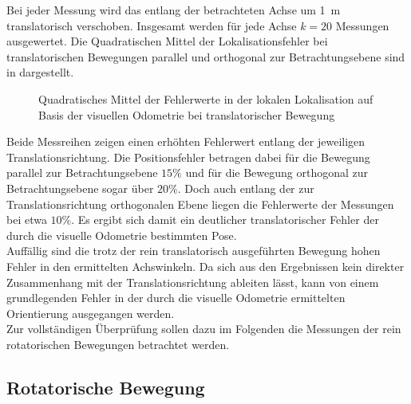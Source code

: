 Bei jeder Messung wird das \kps{} entlang der betrachteten Achse um \SI{1}{\meter} translatorisch verschoben. Insgesamt werden für jede Achse $k=20$ Messungen ausgewertet. Die Quadratischen Mittel der Lokalisationsfehler bei translatorischen Bewegungen parallel und orthogonal zur Betrachtungsebene sind in  dargestellt.\\

\begin{figure}

\caption{Quadratisches Mittel der Fehlerwerte in der lokalen Lokalisation auf Basis der visuellen Odometrie bei translatorischer Bewegung}
\label{fig.loc_loc_trans}
\end{figure}

Beide Messreihen zeigen einen erhöhten Fehlerwert entlang der jeweiligen Translationsrichtung. Die Positionsfehler betragen dabei für die Bewegung parallel zur Betrachtungsebene $15\%$ und für die Bewegung orthogonal zur Betrachtungsebene sogar über $20\%$. Doch auch entlang der zur Translationsrichtung orthogonalen Ebene liegen die Fehlerwerte der Messungen bei etwa $10\%$. Es ergibt sich damit ein deutlicher translatorischer Fehler der durch die visuelle Odometrie bestimmten Pose.\\

Auffällig sind die trotz der rein translatorisch ausgeführten Bewegung hohen Fehler in den ermittelten Achswinkeln. Da sich aus den Ergebnissen kein direkter Zusammenhang mit der Translationsrichtung ableiten lässt, kann von einem grundlegenden Fehler in der durch die visuelle Odometrie ermittelten Orientierung ausgegangen werden.\\
Zur vollständigen Überprüfung sollen dazu im Folgenden die Messungen der rein rotatorischen Bewegungen betrachtet werden.


\subsection{Rotatorische Bewegung}

